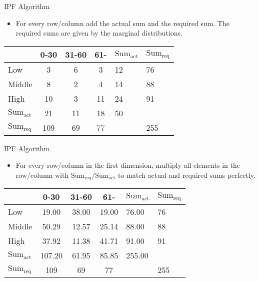 \documentclass{beamer}
\begin{document}
\newcommand{\sumact}{\ensuremath{\text{Sum}_{\text{act}}}}
\newcommand{\sumreq}{\ensuremath{\text{Sum}_{\text{req}}}}
\begin{frame}{IPF Algorithm}
\begin{itemize}
\item For every row/column add the actual sum and the required sum.
  The required sums are given by the marginal distributions.
\end{itemize}

\begin{table}
\centering
\begin{tabular}{l||c c c||l|l}
      & 0-30 & 31-60 & 61- & \sumact{} & \sumreq{}\\
\hline \hline
Low      &   3 &   6 &   3 &  12 &  76 \\
Middle   &   8 &   2 &   4 &  14 &  88 \\
High     &  10 &   3 &  11 &  24 &  91 \\
\hline \hline
\sumact{}&  21 &  11 &  18 &  50 &     \\
\hline
\sumreq{}& 109 &  69 &  77 &     & 255 \\
\end{tabular}
\end{table}
\end{frame}


\begin{frame}{IPF Algorithm}
\begin{itemize}
\item For every row/column in the first dimension, multiply all
  elements in the row/column with \(\sumreq{}/\sumact{}\)
  to match actual and required sums perfectly.
\end{itemize}

\begin{table}
\centering
\begin{tabular}{l||c c c||l|l}
         &  0-30 & 31-60 & 61-   & \sumact{} & \sumreq{}\\
\hline \hline
Low      &  19.00 &  38.00 &  19.00 &  76.00 &  76 \\
Middle   &  50.29 &  12.57 &  25.14 &  88.00 &  88 \\
High     &  37.92 &  11.38 &  41.71 &  91.00 &  91 \\
\hline \hline
\sumact{}& 107.20 &  61.95 &  85.85 & 255.00 &     \\
\hline
\sumreq{}& 109    &  69    &  77    &        & 255 \\
\end{tabular}
\end{table}
\end{frame}
\end{document}

